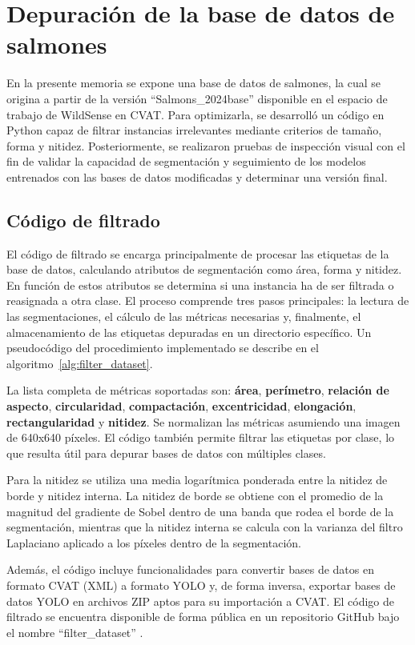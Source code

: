 \section{Depuración de la base de datos de salmones}
En la presente memoria se expone una base de datos de salmones, la cual se origina a partir de la versión ``Salmons\_2024base'' disponible en el espacio de trabajo de WildSense en CVAT. Para optimizarla, se desarrolló un código en Python capaz de filtrar instancias irrelevantes mediante criterios de tamaño, forma y nitidez. Posteriormente, se realizaron pruebas de inspección visual con el fin de validar la capacidad de segmentación y seguimiento de los modelos entrenados con las bases de datos modificadas y determinar una versión final.

\subsection{Código de filtrado}
El código de filtrado se encarga principalmente de procesar las etiquetas de la base de datos, calculando atributos de segmentación como área, forma y nitidez. En función de estos atributos se determina si una instancia ha de ser filtrada o reasignada a otra clase. El proceso comprende tres pasos principales: la lectura de las segmentaciones, el cálculo de las métricas necesarias y, finalmente, el almacenamiento de las etiquetas depuradas en un directorio específico. Un pseudocódigo del procedimiento implementado se describe en el algoritmo~\ref{alg:filter_dataset}.

La lista completa de métricas soportadas son: \textbf{área}, \textbf{perímetro}, \textbf{relación de aspecto}, \textbf{circularidad}, \textbf{compactación}, \textbf{excentricidad}, \textbf{elongación}, \textbf{rectangularidad} y \textbf{nitidez}. Se normalizan las métricas asumiendo una imagen de 640x640 píxeles. El código también permite filtrar las etiquetas por clase, lo que resulta útil para depurar bases de datos con múltiples clases.

Para la nitidez se utiliza una media logarítmica ponderada entre la nitidez de borde y nitidez interna. La nitidez de borde se obtiene con el promedio de la magnitud del gradiente de Sobel dentro de una banda que rodea el borde de la segmentación, mientras que la nitidez interna se calcula con la varianza del filtro Laplaciano aplicado a los píxeles dentro de la segmentación.

Además, el código incluye funcionalidades para convertir bases de datos en formato CVAT (XML) a formato YOLO y, de forma inversa, exportar bases de datos YOLO en archivos ZIP aptos para su importación a CVAT. El código de filtrado se encuentra disponible de forma pública en un repositorio GitHub bajo el nombre \enquote{filter\_dataset} \cite{Lopez2025-Filter}.

